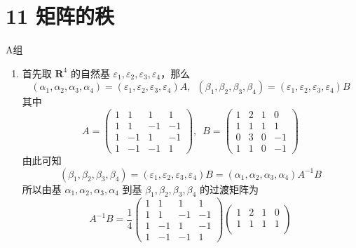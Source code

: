\section*{11 矩阵的秩}

\vspace{2ex}

\centerline{\heiti A组}
\begin{enumerate}
    \item 首先取 $ \mathbf{R}^4 $ 的自然基 $\varepsilon_1, \varepsilon_2, \varepsilon_3, \varepsilon_4$，那么
          \[ (\alpha_1, \alpha_2, \alpha_3, \alpha_4) = (\varepsilon_1, \varepsilon_2, \varepsilon_3, \varepsilon_4) A,\enspace (\beta_1, \beta_2, \beta_3, \beta_4) = (\varepsilon_1, \varepsilon_2, \varepsilon_3, \varepsilon_4) B \]
          其中
          \[ A = \begin{pmatrix}
                  1 & 1  & 1  & 1  \\
                  1 & 1  & -1 & -1 \\
                  1 & -1 & 1  & -1 \\
                  1 & -1 & -1 & 1
              \end{pmatrix},\enspace B = \begin{pmatrix}
                  1 & 2 & 1 & 0  \\
                  1 & 1 & 1 & 1  \\
                  0 & 3 & 0 & -1 \\
                  1 & 1 & 0 & -1
              \end{pmatrix} \]
          由此可知
          \[ (\beta_1, \beta_2, \beta_3, \beta_4) = (\varepsilon_1, \varepsilon_2, \varepsilon_3, \varepsilon_4) B = (\alpha_1, \alpha_2, \alpha_3, \alpha_4) A^{-1} B \]
          所以由基 $ \alpha_1, \alpha_2, \alpha_3, \alpha_4 $ 到基 $ \beta_1, \beta_2, \beta_3, \beta_4 $ 的过渡矩阵为
          \[ A^{-1} B = \frac{1}{4} \begin{pmatrix}
                  1 & 1  & 1  & 1  \\
                  1 & 1  & -1 & -1 \\
                  1 & -1 & 1  & -1 \\
                  1 & -1 & -1 & 1
              \end{pmatrix} \begin{pmatrix}
                  1 & 2 & 1 & 0  \\
                  1 & 1 & 1 & 1  \\

\end{pmatrix}\]
\end{enumerate}
